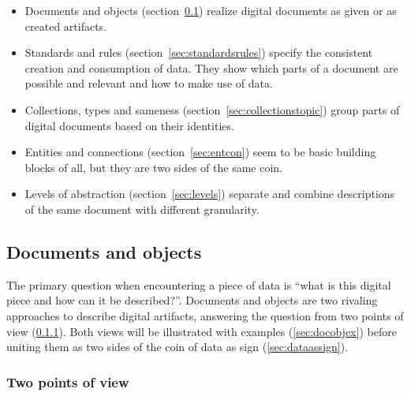 \begin{itemize}
\item Documents and objects (section~\ref{sec:docobj}) realize digital documents 
  as given or as created artifacts.

\item Standards and rules (section~\ref{sec:standardsrules}) specify the consistent
  creation and consumption of data. They show which parts of a document are 
  possible and relevant and how to make use of data.

\item Collections, types and sameness (section~\ref{sec:collectionstopic}) group
  parts of digital documents based on their identities.

\item Entities and connections (section~\ref{sec:entcon}) seem to be basic 
  building blocks of all, but they are two sides of the same coin.

\item Levels of abstraction (section~\ref{sec:levels})
  separate and combine descriptions of the 
  same document with different granularity.
\end{itemize}


\subsection{Documents and objects}
\label{sec:docobj}

The primary question when encountering a piece of data is ``what is this
digital piece and how can it be described?''.  Documents and objects are two
rivaling approaches to describe digital artifacts, answering the question from
two points of view (\ref{sec:tpow}). Both views will be illustrated with examples
(\ref{sec:docobjex}) before uniting them as two sides of the coin of data as sign
(\ref{sec:dataassign}).

\subsubsection{Two points of view}
\label{sec:tpow}

